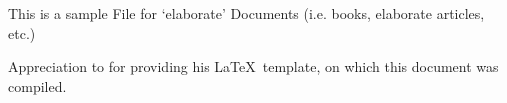 %
%


This is a sample File for \enquote*{elaborate} Documents (i.e. books, elaborate articles, etc.)











%
%
%

%

Appreciation to  for providing his \LaTeX\ template, on which this document was compiled.

